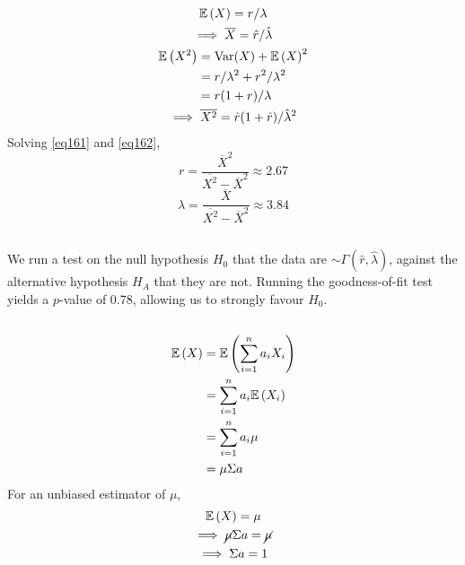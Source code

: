 \documentclass[twocolumn]{article}
\numberwithin{equation}{section}
\begin{document}
\subsection{}
\begin{gather}
\mathbb{E}\left(X\right)=r/\lambda\nonumber\\
\implies \overline X=\hat r/\hat \lambda\label{eq161}\\
\begin{aligned}
\mathbb{E}\left(X^2\right)&=\text{Var}(X)+\mathbb{E}\left(X\right)^2\\
&=r/\lambda^2+r^2/\lambda^2\\
&=r(1+r)/\lambda\\
\end{aligned}\nonumber\\
\implies \overline{X^2}=\hat r(1+\hat r)/{\hat{\lambda}}^2\label{eq162}
\end{gather}
Solving \ref{eq161} and \ref{eq162},
\[
r=\frac{\overline{X}^2}{\overline{X^2}-\overline{X}^2}\approx 2.67
\]\[
\lambda=\frac{\overline{X}}{\overline{X^2}-\overline{X}^2}\approx 3.84
\]

\subsection{}
We run a test on the null hypothesis $H_0$ that the data are $\sim\Gamma(\hat r,\hat\lambda)$, against the alternative hypothesis $H_A$ that they are not. Running the goodness-of-fit test yields a $p$-value of 0.78, allowing us to strongly favour $H_0$.

\subsection{}

\begin{align*}
\mathbb{E}\left(X\right)&=\mathbb{E}\left(\sum_{i=1}^n a_iX_i\right)\\
&=\sum_{i=1}^n a_i\mathbb{E}\left(X_i\right)\\
&=\sum_{i=1}^n a_i\mu\\
&=\mu\Sigma a
\end{align*}
For an unbiased estimator of $\mu$,\begin{gather*}
\mathbb{E}\left(X\right)=\mu\\
\implies \cancel{\mu}\Sigma a=\cancel{\mu}\\
\implies \Sigma a=1
\end{gather*}




\end{document}
